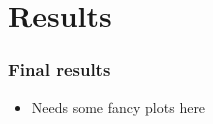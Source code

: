 \section{Results}

\begin{frame}
	\frametitle{Final results}
	\begin{itemize}
		\item Needs some fancy plots here
	\end{itemize}
\end{frame}
